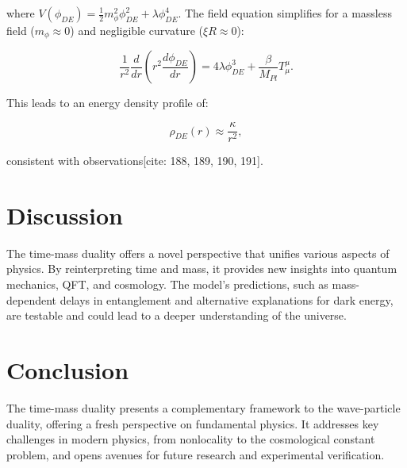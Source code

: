 \documentclass[a4paper,12pt]{article}
\theoremstyle{definition}
\theoremstyle{remark}
\begin{document}
	where \( V(\phi_{DE}) = \frac{1}{2} m_\phi^2 \phi_{DE}^2 + \lambda \phi_{DE}^4 \). The field equation simplifies for a massless field (\( m_\phi \approx 0 \)) and negligible curvature (\( \xi R \approx 0 \)):
	
	\begin{equation}
		\frac{1}{r^2} \frac{d}{dr} \left(r^2 \frac{d\phi_{DE}}{dr}\right) = 4 \lambda \phi_{DE}^3 + \frac{\beta}{M_{Pl}} T^{\mu}_{\mu}.
	\end{equation}
	
	This leads to an energy density profile of:
	
	\begin{equation}
		\rho_{DE}(r) \approx \frac{\kappa}{r^2},
	\end{equation}
	
	consistent with observations[cite: 188, 189, 190, 191].
	
	\section{Discussion}
	
	The time-mass duality offers a novel perspective that unifies various aspects of physics. By reinterpreting time and mass, it provides new insights into quantum mechanics, QFT, and cosmology. The model's predictions, such as mass-dependent delays in entanglement and alternative explanations for dark energy, are testable and could lead to a deeper understanding of the universe.
	
	\section{Conclusion}
	
	The time-mass duality presents a complementary framework to the wave-particle duality, offering a fresh perspective on fundamental physics. It addresses key challenges in modern physics, from nonlocality to the cosmological constant problem, and opens avenues for future research and experimental verification.
	
\end{document}
